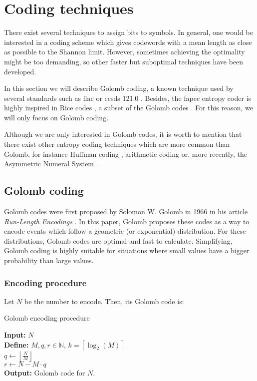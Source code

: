 \section{Coding techniques}
There exist several techniques to assign bits to symbols. In general, one would be interested in a coding scheme which gives codewords with a mean length as close as possible to the Shannon limit. However, sometimes achieving the optimality might be too demanding, so other faster but suboptimal techniques have been developed.

In this section we will describe Golomb coding, a known technique used by several standards such as \acrshort{flac} \parencite{FLAC} or \acrshort{ccsds} 121.0 \parencite{ccsds121}. Besides, the \acrshort{fapec} entropy coder \parencite{PaperFAPEC} is highly inspired in Rice codes \parencite{RiceCodes}, a subset of the Golomb codes \parencite{Golomb1966}. For this reason, we will only focus on Golomb coding.

Although we are only interested in Golomb codes, it is worth to mention that there exist other entropy coding techniques which are more common than Golomb, for instance Huffman coding \parencite{cover}, arithmetic coding \parencite{MacKay} or, more recently, the Asymmetric Numeral System \parencite{ans}.

\subsection{Golomb coding} \label{golomb-coding}
Golomb codes were first proposed by Solomon W. Golomb in 1966 in his article \textit{Run-Length Encodings} \parencite{Golomb1966}. In this paper, Golomb proposes these codes as a way to encode events which follow a geometric (or exponential) distribution. For these distributions, Golomb codes are optimal \parencite{OptimalRice} \parencite{OptimalGeometric} and fast to calculate. Simplifying, Golomb coding is highly suitable for situations where small values have a bigger probability than large values.

\subsubsection{Encoding procedure}
Let $N$ be the number to encode. Then, its Golomb code is:

\begin{algorithm}[H]
	\caption{Golomb encoding procedure}
	\SetAlgoLined
	\textbf{Input:} $N$\\
	\textbf{Define:} $M,q,r \in \mathbb{N}$, \quad $k = \left\lceil \log_2(M) \right\rceil$\\
	$q \gets \left\lfloor \frac{N}{M} \right\rfloor$\\
	$r \gets N - M \cdot q$\\
	\textbf{Output:} Golomb code for $N$.
\end{algorithm}

